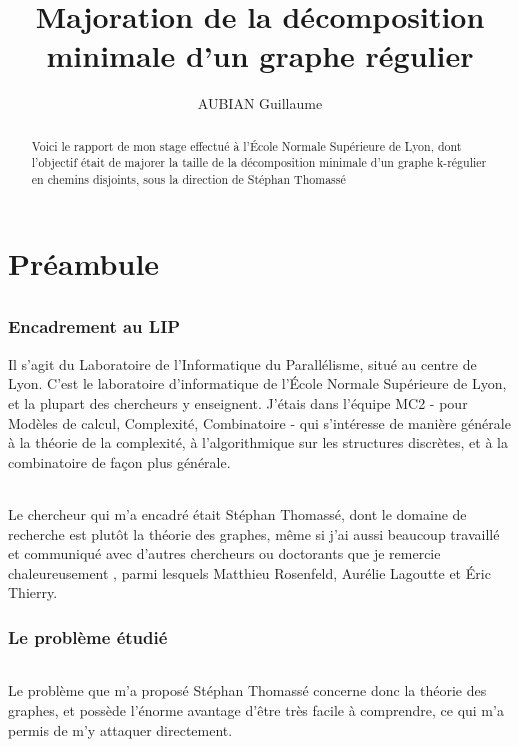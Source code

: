 \documentclass[a4paper]{article}
\title{Majoration de la décomposition minimale d'un graphe régulier}
\author{AUBIAN Guillaume}
\theoremstyle{definition}
\theoremstyle{remark}
\begin{document}
\maketitle

\begin{abstract}
Voici le rapport de mon stage effectué à l'École Normale Supérieure de Lyon, dont l'objectif était de majorer la taille
de la décomposition minimale d'un graphe k-régulier en chemins disjoints, sous la direction de
Stéphan Thomassé
\end{abstract}

\part{Préambule}

\paragraph{}

\section{Encadrement au LIP}
Il s'agit du Laboratoire de l'Informatique du Parallélisme, situé au centre de Lyon. C'est le laboratoire d'informatique de l'École Normale 
Supérieure de Lyon, et la plupart des chercheurs y enseignent. J'étais dans l'équipe MC2 - pour Modèles de calcul, Complexité, Combinatoire -
qui s'intéresse de manière générale à la théorie de la complexité, à 
l'algorithmique sur les structures discrètes, et à la combinatoire de 
façon plus générale.


\paragraph{}
Le chercheur qui m'a encadré était Stéphan Thomassé, dont le domaine
de recherche est plutôt la théorie des graphes, même si j'ai aussi
beaucoup travaillé et communiqué avec d'autres chercheurs ou doctorants 
que je remercie chaleureusement , parmi lesquels Matthieu Rosenfeld, Aurélie Lagoutte et Éric Thierry.


\section{Le problème étudié}

\paragraph{}
Le problème que m'a proposé Stéphan Thomassé concerne donc la théorie 
des graphes, et possède l'énorme avantage d'être très facile à 
comprendre, ce qui m'a permis de m'y attaquer directement.
\end{document}
